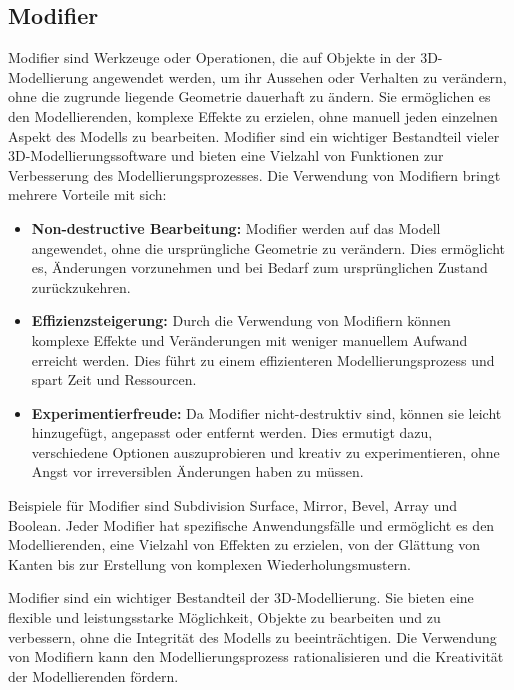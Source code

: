 \subsection{Modifier}
Modifier sind Werkzeuge oder Operationen, die auf Objekte in der 3D-Modellierung angewendet werden, um ihr Aussehen oder
Verhalten zu verändern, ohne die zugrunde liegende Geometrie dauerhaft zu ändern. Sie ermöglichen es den Modellierenden,
komplexe Effekte zu erzielen, ohne manuell jeden einzelnen Aspekt des Modells zu bearbeiten. Modifier sind ein wichtiger
Bestandteil vieler 3D-Modellierungssoftware und bieten eine Vielzahl von Funktionen zur Verbesserung des Modellierungsprozesses.
Die Verwendung von Modifiern bringt mehrere Vorteile mit sich:

\begin{itemize}
    \item \textbf{Non-destructive Bearbeitung:} Modifier werden auf das Modell angewendet, ohne die ursprüngliche
    Geometrie zu verändern. Dies ermöglicht es, Änderungen vorzunehmen und bei Bedarf zum ursprünglichen Zustand
    zurückzukehren.

    \item \textbf{Effizienzsteigerung:} Durch die Verwendung von Modifiern können komplexe Effekte und Veränderungen mit
    weniger manuellem Aufwand erreicht werden. Dies führt zu einem effizienteren Modellierungsprozess und spart
    Zeit und Ressourcen.

    \item \textbf{Experimentierfreude:} Da Modifier nicht-destruktiv sind, können sie leicht hinzugefügt, angepasst oder
    entfernt werden. Dies ermutigt dazu, verschiedene Optionen auszuprobieren und kreativ zu experimentieren, ohne
    Angst vor irreversiblen Änderungen haben zu müssen.
\end{itemize}

Beispiele für Modifier sind Subdivision Surface, Mirror, Bevel, Array und Boolean. Jeder Modifier hat spezifische
Anwendungsfälle und ermöglicht es den Modellierenden, eine Vielzahl von Effekten zu erzielen, von der Glättung von
Kanten bis zur Erstellung von komplexen Wiederholungsmustern.

Modifier sind ein wichtiger Bestandteil der 3D-Modellierung. Sie bieten eine flexible und leistungsstarke Möglichkeit,
Objekte zu bearbeiten und zu verbessern, ohne die Integrität des Modells zu beeinträchtigen. Die Verwendung von Modifiern
kann den Modellierungsprozess rationalisieren und die Kreativität der Modellierenden fördern.

